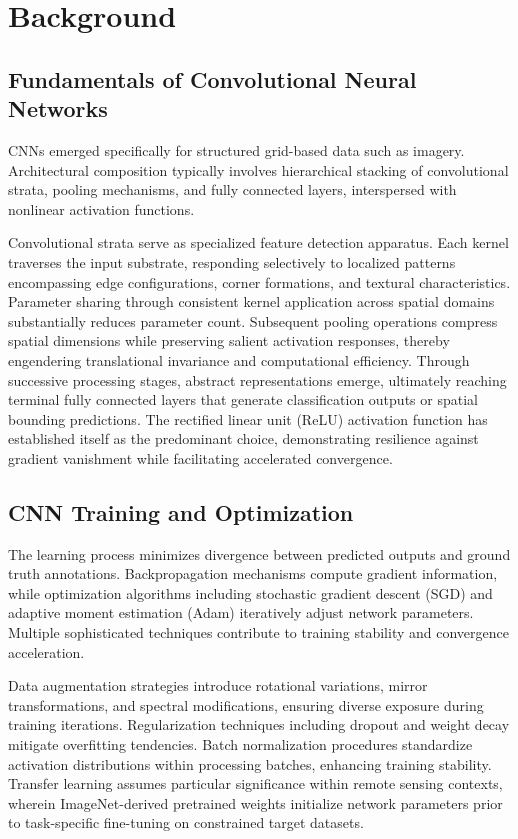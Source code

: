 \documentclass[12pt,a4paper]{article}
\begin{document}
\section{Background}
\label{sec:background}
\subsection{Fundamentals of Convolutional Neural Networks}
CNNs emerged specifically for structured grid-based data such as imagery. Architectural composition typically involves hierarchical stacking of convolutional strata, pooling mechanisms, and fully connected layers, interspersed with nonlinear activation functions.

Convolutional strata serve as specialized feature detection apparatus. Each kernel traverses the input substrate, responding selectively to localized patterns encompassing edge configurations, corner formations, and textural characteristics. Parameter sharing through consistent kernel application across spatial domains substantially reduces parameter count. Subsequent pooling operations compress spatial dimensions while preserving salient activation responses, thereby engendering translational invariance and computational efficiency. Through successive processing stages, abstract representations emerge, ultimately reaching terminal fully connected layers that generate classification outputs or spatial bounding predictions. The rectified linear unit (ReLU) activation function has established itself as the predominant choice, demonstrating resilience against gradient vanishment while facilitating accelerated convergence.

\subsection{CNN Training and Optimization}
The learning process minimizes divergence between predicted outputs and ground truth annotations. Backpropagation mechanisms compute gradient information, while optimization algorithms including stochastic gradient descent (SGD) and adaptive moment estimation (Adam) iteratively adjust network parameters. Multiple sophisticated techniques contribute to training stability and convergence acceleration.

Data augmentation strategies introduce rotational variations, mirror transformations, and spectral modifications, ensuring diverse exposure during training iterations. Regularization techniques including dropout and weight decay mitigate overfitting tendencies. Batch normalization procedures standardize activation distributions within processing batches, enhancing training stability. Transfer learning assumes particular significance within remote sensing contexts, wherein ImageNet-derived pretrained weights initialize network parameters prior to task-specific fine-tuning on constrained target datasets.
\end{document}
